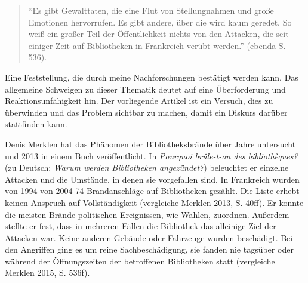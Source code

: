 \documentclass[a4paper,
fontsize=11pt,
oneside,
numbers=noperiodatend,
parskip=half-,
bibliography=totoc,
final
]{scrartcl}
\begin{document}
\begin{quote}
\enquote{Es gibt Gewalttaten, die eine Flut von Stellungnahmen und große
Emotionen hervorrufen. Es gibt andere, über die wird kaum geredet. So
weiß ein großer Teil der Öffentlichkeit nichts von den Attacken, die
seit einiger Zeit auf Bibliotheken in Frankreich verübt werden.} (ebenda
S. 536).
\end{quote}

Eine Feststellung, die durch meine Nachforschungen bestätigt werden
kann. Das allgemeine Schweigen zu dieser Thematik deutet auf eine
Überforderung und Reaktionsunfähigkeit hin. Der vorliegende Artikel ist
ein Versuch, dies zu überwinden und das Problem sichtbar zu machen,
damit ein Diskurs darüber stattfinden kann.

Denis Merklen hat das Phänomen der Bibliotheksbrände über Jahre
untersucht und 2013 in einem Buch veröffentlicht. In \emph{Pourquoi
brûle-t-on des bibliothèques?} (zu Deutsch: \emph{Warum werden
Bibliotheken angezündet?}) beleuchtet er einzelne Attacken und die
Umstände, in denen sie vorgefallen sind. In Frankreich wurden von 1994
von 2004 74 Brandanschläge auf Bibliotheken gezählt. Die Liste erhebt
keinen Anspruch auf Vollständigkeit (vergleiche Merklen 2013, S. 40ff).
Er konnte die meisten Brände politischen Ereignissen, wie Wahlen,
zuordnen. Außerdem stellte er fest, dass in mehreren Fällen die
Bibliothek das alleinige Ziel der Attacken war. Keine anderen Gebäude
oder Fahrzeuge wurden beschädigt. Bei den Angriffen ging es um reine
Sachbeschädigung, sie fanden nie tagsüber oder während der
Öffnungszeiten der betroffenen Bibliotheken statt (vergleiche Merklen
2015, S. 536f).
\end{document}
